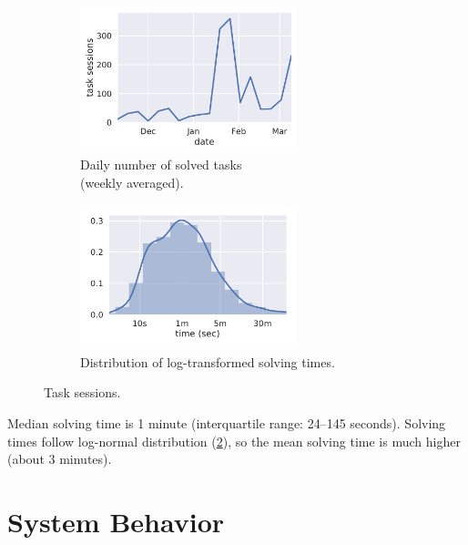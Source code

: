 \begin{figure}[htb]
\centering
\begin{subfigure}{.49\textwidth}
\centering
\includegraphics[height=42mm]{img/daily-task-sessions}
\caption{Daily number of solved tasks\\(weekly averaged).}
\label{fig:solved-count}
\end{subfigure}
\begin{subfigure}{.49\textwidth}
\centering
\includegraphics[height=42mm]{img/task-sessions-time-log}
\caption{Distribution of log-transformed solving times.}
\label{fig:solving-times-all}
\end{subfigure}
\caption{Task sessions.}
\label{fig:daily-task-sessions}
\end{figure}

Median solving time is 1 minute (interquartile range: 24--145 seconds).
Solving times follow log-normal distribution (\cref{fig:solving-times-all}),
so the mean solving time is much higher
(about 3 minutes). %


\section{System Behavior}

